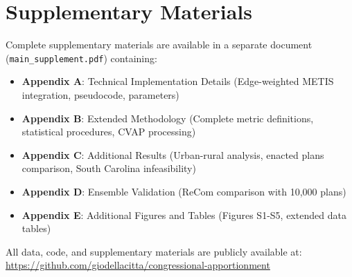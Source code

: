 \documentclass[12pt,letterpaper]{article}
\begin{document}
\doublespacing










\clearpage


\singlespacing


\appendix
\section*{Supplementary Materials}

Complete supplementary materials are available in a separate document (\texttt{main\_supplement.pdf}) containing:

\begin{itemize}
    \item \textbf{Appendix A}: Technical Implementation Details (Edge-weighted METIS integration, pseudocode, parameters)
    \item \textbf{Appendix B}: Extended Methodology (Complete metric definitions, statistical procedures, CVAP processing)
    \item \textbf{Appendix C}: Additional Results (Urban-rural analysis, enacted plans comparison, South Carolina infeasibility)
    \item \textbf{Appendix D}: Ensemble Validation (ReCom comparison with 10,000 plans)
    \item \textbf{Appendix E}: Additional Figures and Tables (Figures S1-S5, extended data tables)
\end{itemize}

All data, code, and supplementary materials are publicly available at: \url{https://github.com/giodellacitta/congressional-apportionment}
\end{document}
